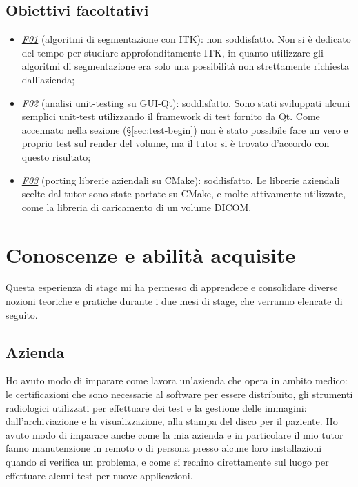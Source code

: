 \subsection{Obiettivi facoltativi}
\begin{itemize}
	 \item \underline{\textit{F01}} (algoritmi di segmentazione con ITK): non soddisfatto. Non si è dedicato del tempo per studiare approfonditamente ITK, in quanto utilizzare gli algoritmi di segmentazione era solo una possibilità non strettamente richiesta dall'azienda;
	 \item \underline{\textit{F02}} (analisi unit-testing su GUI-Qt): soddisfatto. Sono stati sviluppati alcuni semplici unit-test utilizzando il framework di test fornito da Qt. Come accennato nella sezione  (§\ref{sec:test-begin}) non è stato possibile fare un vero e proprio test sul render del volume, ma il tutor si è trovato d'accordo con questo risultato;
	 \item \underline{\textit{F03}} (porting librerie aziendali su CMake): soddisfatto. Le librerie aziendali scelte dal tutor sono state portate su CMake, e molte attivamente utilizzate, come la libreria di caricamento di un volume DICOM.
\end{itemize}

\section{Conoscenze e abilità acquisite}
Questa esperienza di stage mi ha permesso di apprendere e consolidare diverse nozioni teoriche e pratiche durante i due mesi di stage, che verranno elencate di seguito.

\subsection{Azienda}
Ho avuto modo di imparare come lavora un'azienda che opera in ambito medico: le certificazioni che sono necessarie al software per essere distribuito, gli strumenti radiologici utilizzati per effettuare dei test e la gestione delle immagini: dall'archiviazione e la visualizzazione, alla stampa del disco per il paziente. Ho avuto modo di imparare anche come la mia azienda e in particolare il mio tutor fanno manutenzione in remoto o di persona presso alcune loro installazioni quando si verifica un problema, e come si rechino direttamente sul luogo per effettuare alcuni test per nuove applicazioni.

